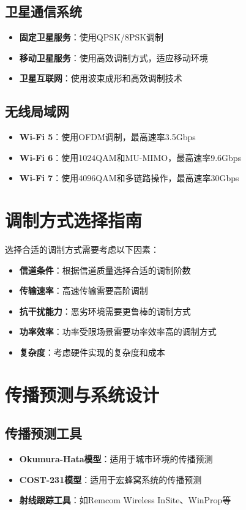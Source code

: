 \documentclass[12pt,UTF8]{ctexbook}
\begin{document}
\subsection{卫星通信系统}
\begin{itemize}[leftmargin=3.5em]
    \item \textbf{固定卫星服务}：使用QPSK/8PSK调制
    \item \textbf{移动卫星服务}：使用高效调制方式，适应移动环境
    \item \textbf{卫星互联网}：使用波束成形和高效调制技术
\end{itemize}

\subsection{无线局域网}
\begin{itemize}[leftmargin=3.5em]
    \item \textbf{Wi-Fi 5}：使用OFDM调制，最高速率3.5Gbps
    \item \textbf{Wi-Fi 6}：使用1024QAM和MU-MIMO，最高速率9.6Gbps
    \item \textbf{Wi-Fi 7}：使用4096QAM和多链路操作，最高速率30Gbps
\end{itemize}

\section{调制方式选择指南}

选择合适的调制方式需要考虑以下因素：
\begin{itemize}[leftmargin=3.5em]
    \item \textbf{信道条件}：根据信道质量选择合适的调制阶数
    \item \textbf{传输速率}：高速传输需要高阶调制
    \item \textbf{抗干扰能力}：恶劣环境需要更鲁棒的调制方式
    \item \textbf{功率效率}：功率受限场景需要功率效率高的调制方式
    \item \textbf{复杂度}：考虑硬件实现的复杂度和成本
\end{itemize}

\section{传播预测与系统设计}

\subsection{传播预测工具}
\begin{itemize}[leftmargin=3.5em]
    \item \textbf{Okumura-Hata模型}：适用于城市环境的传播预测
    \item \textbf{COST-231模型}：适用于宏蜂窝系统的传播预测
    \item \textbf{射线跟踪工具}：如Remcom Wireless InSite、WinProp等
\end{itemize}
\end{document}
